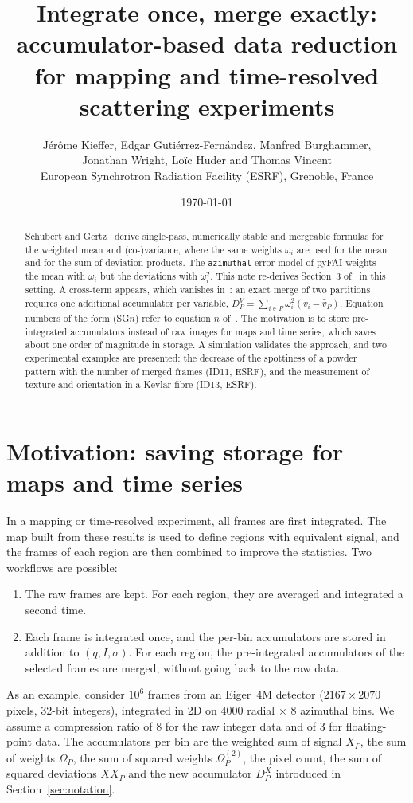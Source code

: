 \documentclass[a4paper,11pt]{article}
\title{Integrate once, merge exactly: accumulator-based data reduction for mapping and time-resolved scattering experiments}
\author{Jérôme Kieffer, Edgar Gutiérrez-Fernández, Manfred Burghammer,\\
Jonathan Wright, Loïc Huder and Thomas Vincent\\[0.5em]
\normalsize European Synchrotron Radiation Facility (ESRF), Grenoble, France}
\date{\today}
\newcommand{\mean}[1]{\widehat{#1}}
\newcommand{\Om}{\Omega}
\newcommand{\OmS}{\Omega^{(2)}}
\newcommand{\D}[2]{D^{#1}_{#2}}
\begin{document}
\maketitle

\begin{abstract}
Schubert and Gertz~\cite{SG18} derive single-pass, numerically stable and mergeable formulas for
the weighted mean and (co-)variance, where the same weights $\omega_i$ are used for the mean and for
the sum of deviation products. The \texttt{azimuthal} error model of pyFAI weights the mean with
$\omega_i$ but the deviations with $\omega_i^2$. This note re-derives Section~3 of~\cite{SG18} in this
setting. A cross-term appears, which vanishes in~\cite{SG18}: an exact merge of two partitions
requires one additional accumulator per variable, $\D{V}{P} = \sum_{i\in P}\omega_i^2(v_i-\mean{v}_P)$.
Equation numbers of the form (SG$n$) refer to equation $n$ of~\cite{SG18}.
The motivation is to store pre-integrated accumulators instead of raw images for maps and time
series, which saves about one order of magnitude in storage. A simulation validates the approach, and
two experimental examples are presented: the decrease of the spottiness of a powder pattern with the
number of merged frames (ID11, ESRF), and the measurement of texture and orientation in a Kevlar fibre
(ID13, ESRF).
\end{abstract}

\section{Motivation: saving storage for maps and time series}

In a mapping or time-resolved experiment, all frames are first integrated. The map built from these
results is used to define regions with equivalent signal, and the frames of each region are then
combined to improve the statistics. Two workflows are possible:
\begin{enumerate}
\item The raw frames are kept. For each region, they are averaged and integrated a second time.
\item Each frame is integrated once, and the per-bin accumulators are stored in addition to
  $(q, I, \sigma)$. For each region, the pre-integrated accumulators of the selected frames are merged,
  without going back to the raw data.
\end{enumerate}

As an example, consider $10^6$ frames from an Eiger~4M detector ($2167\times2070$ pixels, 32-bit
integers), integrated in 2D on $4000$ radial $\times$ $8$ azimuthal bins. We assume a compression ratio of
8 for the raw integer data and of 3 for floating-point data. The accumulators per bin are the weighted
sum of signal $X_P$, the sum of weights $\Om_P$, the sum of squared weights $\OmS_P$, the pixel count,
the sum of squared deviations $XX_P$ and the new accumulator $\D{X}{P}$ introduced in
Section~\ref{sec:notation}.
\end{document}
